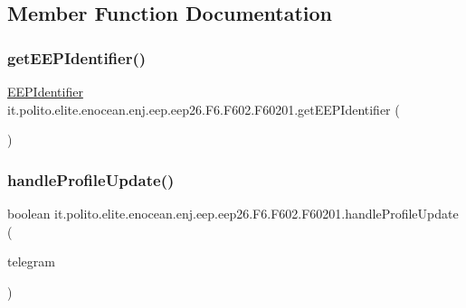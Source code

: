 \subsection{Member Function Documentation}
\hypertarget{classit_1_1polito_1_1elite_1_1enocean_1_1enj_1_1eep_1_1eep26_1_1_f6_1_1_f602_1_1_f60201_a0a73ebc6d5d1279f1d6008e5866f4d40}{}\label{classit_1_1polito_1_1elite_1_1enocean_1_1enj_1_1eep_1_1eep26_1_1_f6_1_1_f602_1_1_f60201_a0a73ebc6d5d1279f1d6008e5866f4d40} 
\subsubsection{\texorpdfstring{get\+E\+E\+P\+Identifier()}{getEEPIdentifier()}}
{\footnotesize\ttfamily \hyperlink{classit_1_1polito_1_1elite_1_1enocean_1_1enj_1_1eep_1_1_e_e_p_identifier}{E\+E\+P\+Identifier} it.\+polito.\+elite.\+enocean.\+enj.\+eep.\+eep26.\+F6.\+F602.\+F60201.\+get\+E\+E\+P\+Identifier (\begin{DoxyParamCaption}{ }\end{DoxyParamCaption})}

\hypertarget{classit_1_1polito_1_1elite_1_1enocean_1_1enj_1_1eep_1_1eep26_1_1_f6_1_1_f602_1_1_f60201_acd55055af25b3eb6b59e1838b52cbe4d}{}\label{classit_1_1polito_1_1elite_1_1enocean_1_1enj_1_1eep_1_1eep26_1_1_f6_1_1_f602_1_1_f60201_acd55055af25b3eb6b59e1838b52cbe4d} 
\subsubsection{\texorpdfstring{handle\+Profile\+Update()}{handleProfileUpdate()}}
{\footnotesize\ttfamily boolean it.\+polito.\+elite.\+enocean.\+enj.\+eep.\+eep26.\+F6.\+F602.\+F60201.\+handle\+Profile\+Update (\begin{DoxyParamCaption}\item[{\hyperlink{classit_1_1polito_1_1elite_1_1enocean_1_1enj_1_1eep_1_1eep26_1_1telegram_1_1_e_e_p26_telegram}{E\+E\+P26\+Telegram}}]{telegram }\end{DoxyParamCaption})}




